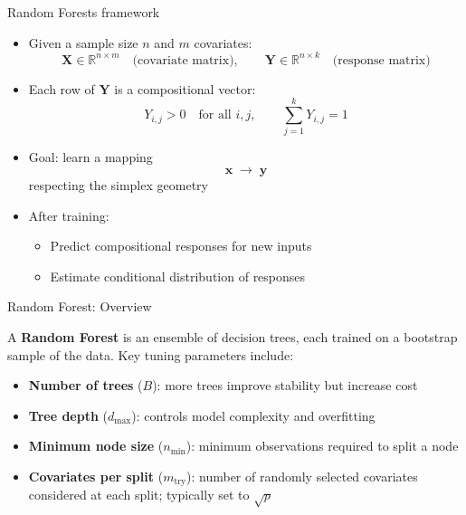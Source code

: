 \begin{frame}{Random Forests framework}
 
\begin{itemize}
   \item[\textcolor{blue}{\large$\blacktriangleright$}]  Given a sample size $n$ and $m$ covariates:
    \[
        \mathbf{X} \in \mathbb{R}^{n \times m} \quad \text{(covariate matrix)}, \qquad
        \mathbf{Y} \in \mathbb{R}^{n \times k} \quad \text{(response matrix)}
    \]
    
  \item[\textcolor{blue}{\large$\blacktriangleright$}]  Each row of \( \mathbf{Y} \) is a compositional vector:
    \[
        Y_{i,j} > 0 \quad \text{for all } i, j, \qquad \sum_{j=1}^k Y_{i,j} = 1
    \]
        
  
     \item[\textcolor{blue}{\large$\blacktriangleright$}] Goal: learn a mapping
    \[
    \mathbf{x} \;\longrightarrow\; \mathbf{y}
    \]
    respecting the simplex geometry
    \vspace{0.8em}


     \item[\textcolor{blue}{\large$\blacktriangleright$}] After training:
    \begin{itemize}
        \item Predict compositional responses for new inputs
        \item Estimate conditional distribution of responses
    \end{itemize}

\end{itemize}
\end{frame}

\begin{frame}{Random Forest: Overview}

A \textbf{Random Forest} is an ensemble of decision trees, each trained on a
bootstrap sample of the data. Key tuning parameters include:

\vspace{0.5em}

\begin{itemize}
    \item \textbf{Number of trees} ($B$): more trees improve stability but increase cost
    \item \textbf{Tree depth} ($d_{\max}$): controls model complexity and overfitting
    \item \textbf{Minimum node size} ($n_{\min}$): minimum observations required to split a node
    \item \textbf{Covariates per split} ($m_{\text{try}}$): number of randomly selected covariates
    considered at each split; typically set to $\sqrt{p}$
\end{itemize}

\end{frame}


